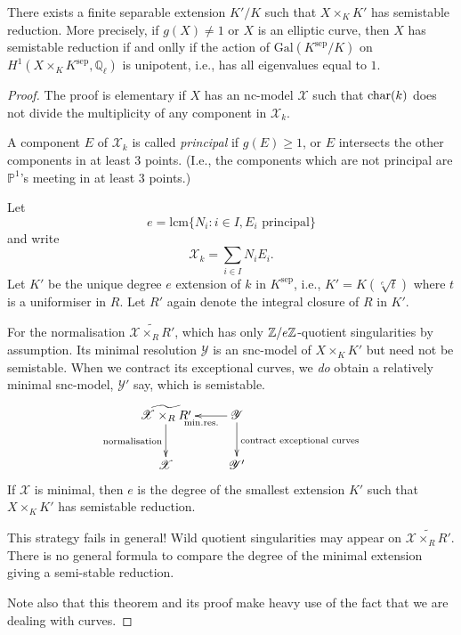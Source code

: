 \begin{theorem}
There exists a finite separable extension $K'/K$ such that $X \times_K K'$ has semistable reduction. More precisely, if $g(X) \neq 1$ or $X$ is an elliptic curve, then $X$ has semistable reduction if and onlly if the action of $\mathrm{Gal}(K^{\mathrm{sep}}/K)$ on $H^1(X\times_K K^{\mathrm{sep}},\mathbb{Q}_{\ell})$ is unipotent, i.e., has all eigenvalues equal to $1$.\end{theorem}

\begin{proof} The proof is elementary if $X$ has an nc-model $\mathcal{X}$ such that $\mathrm{char}(k)$ does not divide the multiplicity of any component in $\mathcal{X}_k$.

A component $E$ of $\mathcal{X}_k$ is called \emph{principal} if $g(E) \geq 1$, or $E$ intersects the other components in at least $3$ points. (I.e., the components which are not principal are $\mathbb{P}^1$'s meeting in at least $3$ points.)

Let $$e = \mathrm{lcm}\{N_i \colon i \in I, E_i \textrm{  principal}\}$$ and write $$\mathcal{X}_k = \sum_{i \in I}N_iE_i.$$ Let $K'$ be the unique degree $e$ extension of $k$ in $K^{\mathrm{sep}}$, i.e., $K' = K(\sqrt[e]{t})$ where $t$ is a uniformiser in $R$. Let $R'$ again denote the integral closure of $R$ in $K'$.

For the normalisation $\widetilde{\mathcal{X} \times_R R'}$, which has only $\mathbb{Z}/e\mathbb{Z}$-quotient singularities by assumption. Its minimal resolution $\mathcal{Y}$ is an snc-model of $X \times_K K'$ but need not be semistable. When we contract its exceptional curves, we \emph{do} obtain a relatively minimal snc-model, $\mathcal{Y}'$ say, which is semistable.
\[
\xymatrix{
\widetilde{\mathcal{X}\times_R R'} \ar[d]_{\mathrm{normalisation}} & \ar[l]^{\mathrm{min. res.}} \mathcal{Y} \ar[d]^{\textrm{contract exceptional curves}} \\
\mathcal{X} & \mathcal{Y}' 
}
\]
If $\mathcal{X}$ is minimal, then $e$ is the degree of the smallest extension $K'$ such that $X \times_K K'$ has semistable reduction.

This strategy fails in general! Wild quotient singularities may appear on $\widetilde{\mathcal{X} \times_R R'}$. There is no general formula to compare the degree of the minimal extension giving a semi-stable reduction.

Note also that this theorem and its proof make heavy use of the fact that we are dealing with curves.
\end{proof}

